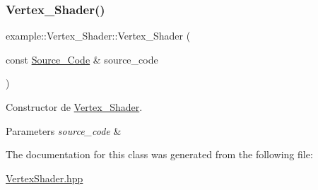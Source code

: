 \subsubsection{\texorpdfstring{Vertex\_Shader()}{Vertex\_Shader()}}
{\footnotesize\ttfamily example\+::\+Vertex\+\_\+\+Shader\+::\+Vertex\+\_\+\+Shader (\begin{DoxyParamCaption}\item[{const \mbox{\hyperlink{classexample_1_1_shader_1_1_source___code}{Source\+\_\+\+Code}} \&}]{source\+\_\+code }\end{DoxyParamCaption})\hspace{0.3cm}{\ttfamily [inline]}}



Constructor de \mbox{\hyperlink{classexample_1_1_vertex___shader}{Vertex\+\_\+\+Shader}}. 


\begin{DoxyParams}{Parameters}
{\em source\+\_\+code} & \\
\hline
\end{DoxyParams}


The documentation for this class was generated from the following file\+:\begin{DoxyCompactItemize}
\item 
\mbox{\hyperlink{_vertex_shader_8hpp}{Vertex\+Shader.\+hpp}}\end{DoxyCompactItemize}
